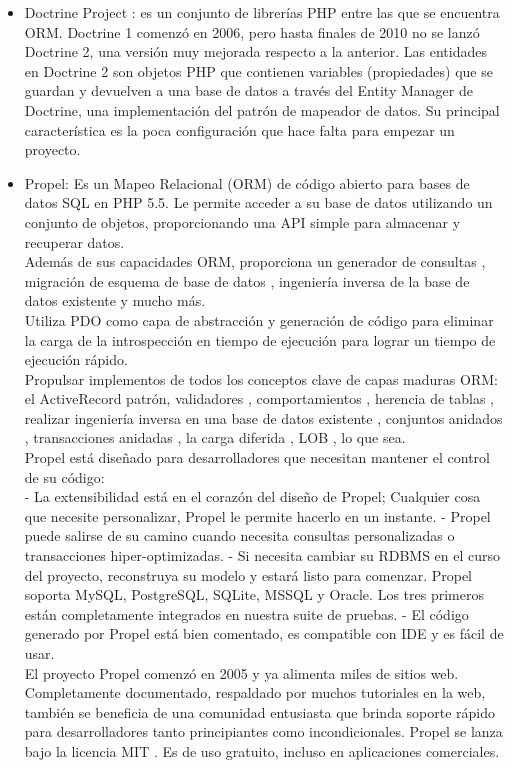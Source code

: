 \documentclass[%
 reprint,
 amsmath,amssymb,
 aps,
]{revtex4-1}
\begin{document}
\begin{itemize}
	\item Doctrine Project : es un conjunto de librerías PHP entre las que se encuentra ORM. Doctrine 1 comenzó en 2006, pero hasta finales de 2010 no se lanzó Doctrine 2, una versión muy mejorada respecto a la anterior. Las entidades en Doctrine 2 son objetos PHP que contienen variables (propiedades) que se guardan y devuelven a una base de datos a través del Entity Manager de Doctrine, una implementación del patrón de mapeador de datos. Su principal característica es la poca configuración que hace falta para empezar un proyecto.\cite{doct}\\
	\item Propel: Es un Mapeo Relacional (ORM) de código abierto para bases de datos SQL en PHP 5.5. Le permite acceder a su base de datos utilizando un conjunto de objetos, proporcionando una API simple para almacenar y recuperar datos.\\
Además de sus capacidades ORM, proporciona un generador de consultas , migración de esquema de base de datos , ingeniería inversa de la base de datos existente y mucho más.\\
Utiliza PDO como capa de abstracción y generación de código para eliminar la carga de la introspección en tiempo de ejecución para lograr un tiempo de ejecución rápido.\\
Propulsar implementos de todos los conceptos clave de capas maduras ORM: el ActiveRecord patrón, validadores , comportamientos , herencia de tablas , realizar ingeniería inversa en una base de datos existente , conjuntos anidados , transacciones anidadas , la carga diferida , LOB , lo que sea.\\
Propel está diseñado para desarrolladores que necesitan mantener el control de su código:\\
- La extensibilidad está en el corazón del diseño de Propel; Cualquier cosa que necesite personalizar, Propel le permite hacerlo en un instante.
- Propel puede salirse de su camino cuando necesita consultas personalizadas o transacciones hiper-optimizadas.
- Si necesita cambiar su RDBMS en el curso del proyecto, reconstruya su modelo y estará listo para comenzar. Propel soporta MySQL, PostgreSQL, SQLite, MSSQL y Oracle. Los tres primeros están completamente integrados en nuestra suite de pruebas.
- El código generado por Propel está bien comentado, es compatible con IDE y es fácil de usar.\\
El proyecto Propel comenzó en 2005 y ya alimenta miles de sitios web. Completamente documentado, respaldado por muchos tutoriales en la web, también se beneficia de una comunidad entusiasta que brinda soporte rápido para desarrolladores tanto principiantes como incondicionales. Propel se lanza bajo la licencia MIT . Es de uso gratuito, incluso en aplicaciones comerciales.\cite{propel}\\

\end{itemize}
\end{document}
